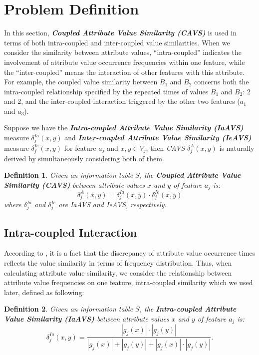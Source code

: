 \documentclass{article}
\newtheorem{Def}{Definition}[section]
\numberwithin{equation}{section}
\begin{document}
\section{Problem Definition}
In this section, \emph{\textbf{Coupled Attribute Value Similarity (CAVS)}} is used in terms of both intra-coupled and inter-coupled value similarities. When we consider the similarity between attribute values, ``intra-coupled'' indicates the involvement of attribute value occurrence frequencies within one feature, while the ``inter-coupled'' means the interaction of other features with this attribute. For example, the coupled value similarity between $B_1$ and $B_2$ concerns both the intra-coupled relationship specified by the repeated times of values $B_1$ and $B_2$: 2 and 2, and the inter-coupled interaction triggered by the other two features ($a_1$ and $a_3$).

Suppose we have the \emph{\textbf{Intra-coupled Attribute Value Similarity (IaAVS)}} measure $\delta_{j}^{Ia}(x,y)$ and \emph{\textbf{Inter-coupled Attribute Value Similarity  (IeAVS)}} measure $\delta_{j}^{Ie}(x,y)$ for feature $a_j$ and $x,y\in V_j$, then \emph{CAVS} $\delta^{A}_{j}(x,y)$ is naturally derived by simultaneously considering both of them.

\begin{Def}
Given an information table $S$, the \textbf{Coupled Attribute Value Similarity (CAVS)} between attribute values $x$  and $y$ of feature $a_j$ is:
\begin{equation}
\delta^{A}_{j}(x,y)=\delta_{j}^{Ia}(x,y)\cdot\delta_{j}^{Ie}(x,y)
\label{eq:CAVS}
\end{equation}
where $\delta_{j}^{Ia}$ and $\delta_{j}^{Ie}$ are IaAVS and IeAVS, respectively.
\end{Def}

\subsection{Intra-coupled Interaction}
According to \cite{Gan:2007}, it is a fact that the discrepancy of attribute value occurrence times reflects the value similarity in terms of frequency distribution. Thus, when calculating attribute value similarity, we consider the relationship between attribute value frequencies on one feature, intra-coupled similarity which we used later, defined as following:

\begin{Def}
Given an information table $S$, the \textbf{Intra-coupled Attribute Value Similarity (IaAVS)} between attribute values $x$  and $y$ of feature $a_j$ is:
\begin{equation}
\delta_{j}^{Ia}(x,y)=\frac{|g_j(x)|\cdot|g_j(y)|}{|g_j(x)|+|g_j(y)|+|g_j(x)|\cdot|g_j(y)|}.
\label{eq:IaAVS}
\end{equation}
\end{Def}
\end{document}
